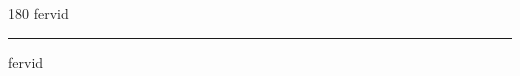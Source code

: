 
\begin{frame}
\begin{center}
\begin{turn}{180}
{\fontsize{2.5cm}{1em}\selectfont fervid}
\end{turn}
\vspace{1em}\par  
\hrule
\vspace{1em}\par  
{\fontsize{2.5cm}{1em}\selectfont fervid}
\end{center}
\end{frame}
